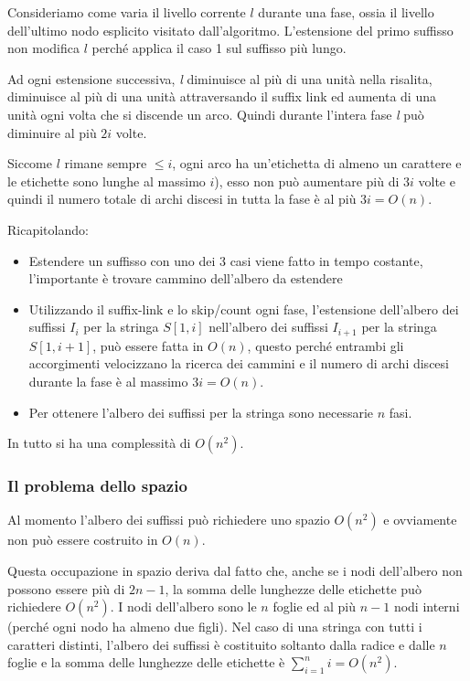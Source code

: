 Consideriamo come varia il livello corrente $l$ durante una fase, ossia il livello dell'ultimo nodo esplicito visitato dall'algoritmo.
L'estensione del primo suffisso non modifica $l$ perché applica il caso 1 sul suffisso più lungo.

Ad ogni estensione successiva, \textit{l} diminuisce al più di una unità nella risalita, diminuisce al più di una unità attraversando il suffix link ed aumenta di una unità ogni volta che si discende un arco. Quindi durante l'intera fase \textit{l} può diminuire al più $2i$ volte.

Siccome $l$ rimane sempre $\leq i$, ogni arco ha un'etichetta di almeno un carattere e le etichette sono lunghe al massimo $i$), esso non può aumentare più di $3i$ volte e quindi il numero totale di archi discesi in tutta la fase è al più $3i = O(n)$.

Ricapitolando:
\begin{itemize}
	\item Estendere un suffisso con uno dei 3 casi viene fatto in tempo costante, l'importante è trovare cammino dell'albero da estendere
	\item Utilizzando il suffix-link e lo skip/count ogni fase, l'estensione dell'albero dei suffissi $I_i$ per la stringa $S[1,i]$ nell'albero dei suffissi $I_{i+1}$ per la stringa $S[1,i+1]$, può essere fatta in $O(n)$, questo perché entrambi gli accorgimenti velocizzano la ricerca dei cammini e il numero di archi discesi durante la fase è al massimo $3i = O(n)$.
	\item Per ottenere l'albero dei suffissi per la stringa sono necessarie $n$ fasi.
\end{itemize}

In tutto si ha una complessità di $O(n^2)$.

\subsubsection{Il problema dello spazio}

Al momento l'albero dei suffissi può richiedere uno spazio $O(n^2)$ e ovviamente non può essere costruito in $O(n)$.

Questa occupazione in spazio deriva dal fatto che, anche se i nodi dell'albero non possono essere più di $2n-1$, la somma delle lunghezze delle etichette può richiedere $O(n^2)$. I nodi dell'albero sono le $n$ foglie ed al più $n-1$ nodi interni (perché ogni nodo ha almeno due figli). Nel caso di una stringa con tutti i caratteri distinti, l'albero dei suffissi è costituito soltanto dalla radice e dalle $n$ foglie e la somma delle lunghezze delle etichette è $\sum_{i=1}^n i = O(n^2)$.

